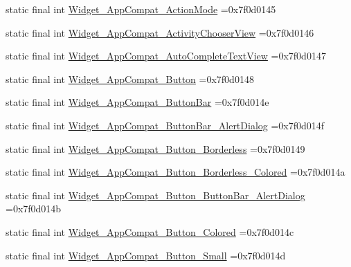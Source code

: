 \begin{DoxyCompactItemize}
\item 
static final int \mbox{\hyperlink{classbr_1_1unb_1_1cic_1_1mp_1_1marketmaster_1_1R_1_1style_a029d2335a9c9d3dcd48ebcc3fba938c2}{Widget\+\_\+\+App\+Compat\+\_\+\+Action\+Mode}} =0x7f0d0145
\item 
static final int \mbox{\hyperlink{classbr_1_1unb_1_1cic_1_1mp_1_1marketmaster_1_1R_1_1style_aae1826b6d1b2d3726533125422666b34}{Widget\+\_\+\+App\+Compat\+\_\+\+Activity\+Chooser\+View}} =0x7f0d0146
\item 
static final int \mbox{\hyperlink{classbr_1_1unb_1_1cic_1_1mp_1_1marketmaster_1_1R_1_1style_aac61706170e2acc2cc081ea6d0a15099}{Widget\+\_\+\+App\+Compat\+\_\+\+Auto\+Complete\+Text\+View}} =0x7f0d0147
\item 
static final int \mbox{\hyperlink{classbr_1_1unb_1_1cic_1_1mp_1_1marketmaster_1_1R_1_1style_a726a74bc45520cddf89fd8d39be14006}{Widget\+\_\+\+App\+Compat\+\_\+\+Button}} =0x7f0d0148
\item 
static final int \mbox{\hyperlink{classbr_1_1unb_1_1cic_1_1mp_1_1marketmaster_1_1R_1_1style_acf9d6534cd7b6fb40369cdf43be6968b}{Widget\+\_\+\+App\+Compat\+\_\+\+Button\+Bar}} =0x7f0d014e
\item 
static final int \mbox{\hyperlink{classbr_1_1unb_1_1cic_1_1mp_1_1marketmaster_1_1R_1_1style_ac6afe5cd05808ca83cfe843b5874f401}{Widget\+\_\+\+App\+Compat\+\_\+\+Button\+Bar\+\_\+\+Alert\+Dialog}} =0x7f0d014f
\item 
static final int \mbox{\hyperlink{classbr_1_1unb_1_1cic_1_1mp_1_1marketmaster_1_1R_1_1style_af091e370f53d14081baf9d9dda091123}{Widget\+\_\+\+App\+Compat\+\_\+\+Button\+\_\+\+Borderless}} =0x7f0d0149
\item 
static final int \mbox{\hyperlink{classbr_1_1unb_1_1cic_1_1mp_1_1marketmaster_1_1R_1_1style_a0ced686087dc180ae06c9daabd501116}{Widget\+\_\+\+App\+Compat\+\_\+\+Button\+\_\+\+Borderless\+\_\+\+Colored}} =0x7f0d014a
\item 
static final int \mbox{\hyperlink{classbr_1_1unb_1_1cic_1_1mp_1_1marketmaster_1_1R_1_1style_af7e332e346eaacdc1b9922275ea40065}{Widget\+\_\+\+App\+Compat\+\_\+\+Button\+\_\+\+Button\+Bar\+\_\+\+Alert\+Dialog}} =0x7f0d014b
\item 
static final int \mbox{\hyperlink{classbr_1_1unb_1_1cic_1_1mp_1_1marketmaster_1_1R_1_1style_af32d1bb1d275ce359aa12a4903e691cd}{Widget\+\_\+\+App\+Compat\+\_\+\+Button\+\_\+\+Colored}} =0x7f0d014c
\item 
static final int \mbox{\hyperlink{classbr_1_1unb_1_1cic_1_1mp_1_1marketmaster_1_1R_1_1style_a0a80a99a79060628eddb0f9964764ae0}{Widget\+\_\+\+App\+Compat\+\_\+\+Button\+\_\+\+Small}} =0x7f0d014d

\end{DoxyCompactItemize}
